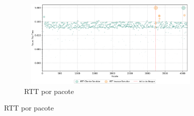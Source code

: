 \begin{apendicesenv}
\begin{figure}[htbp!]
\begin{subfigure}[t]{0.5\textwidth}
        \centering
        \caption{RTT por pacote}
        \includegraphics[width=1\textwidth, height=120pt]{USPSC-img/output/cropped/2-dos_certificate_inf_chain_loop-rttp.png}
    \end{subfigure}%
\end{figure}


\end{apendicesenv}
